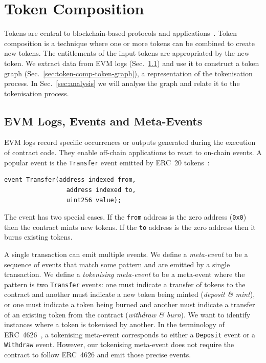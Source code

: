\section{Token Composition}\label{sec:token-composition}

Tokens are central to blockchain-based protocols and
applications~\cite{voshmgir-20}.  Token composition is a technique
where one or more tokens can be combined to create new tokens.  The
entitlements of the input tokens are appropriated by the new token.
We extract data from EVM logs (Sec.~\ref{sec:token-comp-evm-logs}) and
use it to construct a token graph
(Sec.~\ref{sec:token-comp-token-graph}), a representation of the
tokenisation process.  In Sec.~\ref{sec:analysis} we will analyse the
graph and relate it to the tokenisation process.

\subsection{EVM Logs, Events and Meta-Events}\label{sec:token-comp-evm-logs}

EVM logs record specific occurrences or outputs generated during the
execution of contract code.  They enable off-chain applications to
react to on-chain events.  A popular event is the \texttt{Transfer}
event emitted by ERC~20 tokens~\cite{vogelsteller-buterin-15}:

\begin{lstlisting}[language=Solidity,numbers=none,
    caption={The ERC~20 \texttt{Transfer} event specifies three
      parameters: \texttt{from}, \texttt{to}, and \texttt{value}.}]
  event Transfer(address indexed from,
                 address indexed to,
                 uint256 value);
\end{lstlisting}

The event has two special cases.  If the \texttt{from} address is the
zero address (\texttt{0x0}) then the contract mints new tokens.  If
the \texttt{to} address is the zero address then it burns existing
tokens.

A single transaction can emit multiple events.  We define a
\textit{meta-event} to be a sequence of events that match some pattern
and are emitted by a single transaction.  We define a
\textit{tokenising meta-event} to be a meta-event where the pattern is
two \texttt{Transfer} events: one must indicate a transfer of tokens
to the contract and another must indicate a new token being minted
(\textit{deposit \& mint}), or one must indicate a token being burned
and another must indicate a transfer of an existing token from the
contract (\textit{withdraw \& burn}).  We want to identify instances
where a token is tokenised by another.  In the terminology of
ERC~4626~\cite{santoro-et-al-22}, a tokenising meta-event corresponds
to either a \texttt{Deposit} event or a \texttt{Withdraw} event.
However, our tokenising meta-event does not require the contract to
follow ERC~4626 and emit those precise events.

